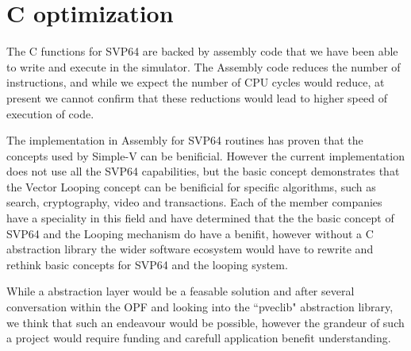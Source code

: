 \chapter{C optimization}

The C functions for SVP64 are backed by assembly code that we have been able to write and execute in the simulator.
The Assembly code reduces the number of instructions, and while we expect the number of CPU cycles would reduce,
at present we cannot confirm that these reductions would lead to higher speed of execution of code.

The implementation in Assembly for SVP64 routines has proven that the concepts used by Simple-V can be benificial.
However the current implementation does not use all the SVP64 capabilities, but the basic concept demonstrates
that the Vector Looping concept can be benificial for specific algorithms, such as search, cryptography, video
and transactions.
Each of the member companies have a speciality in this field and have determined that the the basic concept of
SVP64 and the Looping mechanism do have a benifit, however without a C abstraction library the wider software
ecosystem would have to rewrite and rethink basic concepts for SVP64 and the looping system.

While a abstraction layer would be a feasable solution and after several conversation within the \acrshort{OPF}
and looking into the ``pveclib" abstraction library, we think that such an endeavour would be possible,
however the grandeur of such a project would require funding and carefull application benefit understanding.
